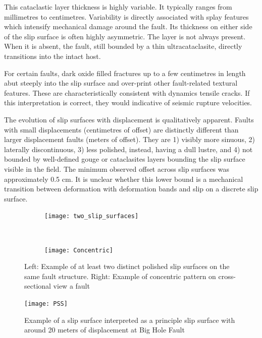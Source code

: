 \documentclass[12pt,a4paper]{article}
\begin{document}
	This cataclastic layer thickness is highly variable. It typically ranges from millimetres to centimetres. Variability is directly associated with splay features which intensify mechanical damage around the fault. Its thickness on either side of the slip surface is often highly asymmetric. The layer is not always present.   When it is absent, the fault, still bounded by a thin ultracataclasite, directly transitions into the intact host. 
	
	For certain faults, dark oxide filled fractures up to a few centimetres in length abut steeply into the slip surface and over-print other fault-related textural features. These are characteristically consistent with dynamics tensile cracks. If this interpretation is correct, they would indicative of seismic rupture velocities.

	The evolution of slip surfaces with displacement is qualitatively apparent. Faults with small displacements (centimetres of offset) are distinctly different than larger displacement faults (meters of offset). They are 1) visibly more sinuous, 2) laterally discontinuous, 3) less polished, instead, having a dull lustre, and 4) not bounded by well-defined gouge or cataclasites layers bounding the slip surface visible in the field. The minimum observed offset across slip surfaces was approximately 0.5 cm. It is unclear whether this lower bound is a mechanical transition between deformation with deformation bands and slip on a discrete slip surface.

\begin{figure}
	\centering
	\begin{subfigure}[b]{0.4\textwidth}
		\texttt{[image: two\_slip\_surfaces]}
	\end{subfigure}
	~
	\begin{subfigure}[b]{0.4\textwidth}
		\texttt{[image: Concentric]}
	\end{subfigure}
	\caption{Left: Example of at least two distinct polished slip surfaces on the same fault structure. Right: Example of concentric pattern on cross-sectional view a fault}
	\label{many_surf}
\end{figure}	

\begin{figure}
	\centering
    \texttt{[image: PSS]}
	
	\caption{Example of a slip surface interpreted as a principle slip surface with around 20 meters of displacement at Big Hole Fault}
	\label{PSS}
\end{figure}
\end{document}
